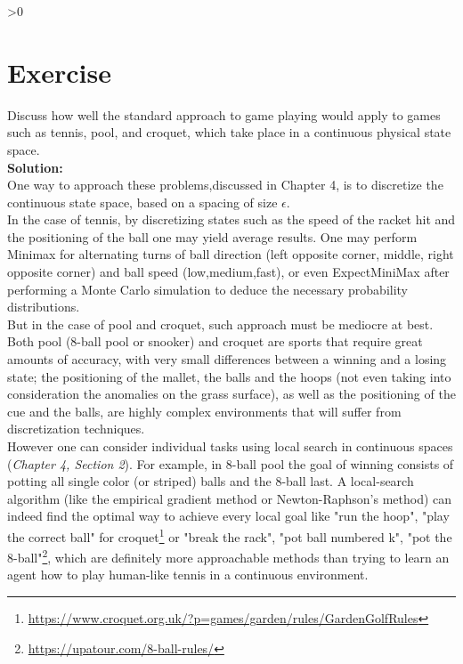 \documentclass{article}
\newcounter{partCounter}
\newcounter{ExerciseCounter}
\newenvironment{Exercise}[1][-1]{
	\ifnum#1>0
	\setcounter{ExerciseCounter}{#1}
	\fi
	\section{Exercise \arabic{ExerciseCounter}}
	\setcounter{partCounter}{1}
}{
}
\newcommand{\solution}{\textbf{\large Solution:}}
\begin{document}
    \begin{Exercise}[3]
    	Discuss how well the standard approach to game playing would apply to games such as tennis, pool, and croquet, which take place in a continuous physical state space. \\
    	
    	\solution \\
    	
    	One way to approach these problems,discussed in Chapter 4, is to discretize the continuous state space, based on a spacing of size $\epsilon$. \\
    	
    	In the case of tennis, by discretizing states such as the speed of the racket hit and the positioning of the ball one may yield average results. One may perform Minimax for alternating turns of ball direction (left opposite corner, middle, right opposite corner) and ball speed (low,medium,fast), or even ExpectMiniMax after performing a Monte Carlo simulation to deduce the necessary probability distributions. \\
    	
    	But in the case of pool and croquet, such approach must be mediocre at best. Both pool (8-ball pool or snooker) and croquet are sports that require great amounts of accuracy, with very small differences between a winning and a losing state; the positioning of the mallet, the balls and the hoops (not even taking into consideration the anomalies on the grass surface), as well as the positioning of the cue and the balls, are highly complex environments that will suffer from discretization techniques. \\
    	
    	However one can consider individual tasks using local search in continuous spaces (\textit{Chapter 4, Section 2}). For example, in 8-ball pool the goal of winning consists of potting all single color (or striped) balls and the 8-ball last. A local-search algorithm (like the empirical gradient method or Newton-Raphson's method) can indeed find the optimal way to achieve every local goal like "run the hoop", "play the correct ball" for croquet\footnote{\url{https://www.croquet.org.uk/?p=games/garden/rules/GardenGolfRules}} or "break the rack", "pot ball numbered k", "pot the 8-ball"\footnote{\url{https://upatour.com/8-ball-rules/}}, which are definitely more approachable methods than trying to learn an agent how to play human-like tennis in a continuous environment.
    	
    \end{Exercise}
\end{document}
